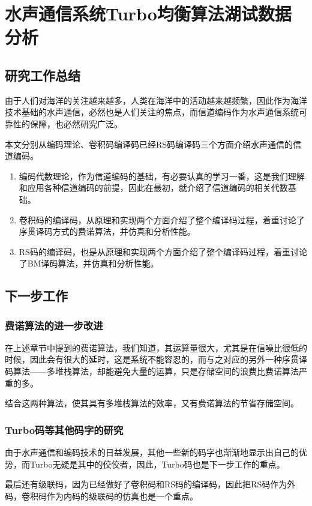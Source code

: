 %
\chapter{水声通信系统Turbo均衡算法湖试数据分析}
\thispagestyle{empty}
\section{研究工作总结}
由于人们对海洋的关注越来越多，人类在海洋中的活动越来越频繁，因此作为海洋技术基础的水声通信，必然也是人们关注的焦点，而信道编码作为水声通信系统可靠性的保障，也必然研究广泛。

本文分别从编码理论、卷积码编译码已经RS码编译码三个方面介绍水声通信的信道编码。
\begin{enumerate}
  \item
    编码代数理论，作为信道编码的基础，有必要认真的学习一番，这是我们理解和应用各种信道编码的前提，因此在最初，就介绍了信道编码的相关代数基础。
  \item
    卷积码的编译码，从原理和实现两个方面介绍了整个编译码过程，着重讨论了序贯译码方式的费诺算法，并仿真和分析性能。
  \item
    RS码的编译码，也是从原理和实现两个方面介绍了整个编译码过程，着重讨论了BM译码算法，并仿真和分析性能。
\end{enumerate}
\section{下一步工作}
\subsection{费诺算法的进一步改进}
在上述章节中提到的费诺算法，我们知道，其运算量很大，尤其是在信噪比很低的时候，因此会有很大的延时，这是系统不能容忍的，而与之对应的另外一种序贯译码算法——多堆栈算法，却能避免大量的运算，只是存储空间的浪费比费诺算法严重的多。

结合这两种算法，使其具有多堆栈算法的效率，又有费诺算法的节省存储空间。
\subsection{Turbo码等其他码字的研究}
由于水声通信和编码技术的日益发展，其他一些新的码字也渐渐地显示出自己的优势，而Turbo无疑是其中的佼佼者，因此，Turbo码也是下一步工作的重点。

最后还有级联码，因为已经做好了卷积码和RS码的编译码，因此把RS码作为外码，卷积码作为内码的级联码的仿真也是一个重点。
%
